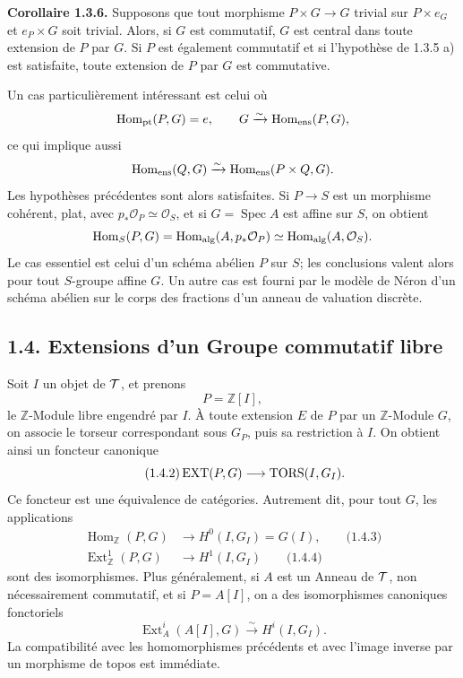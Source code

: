 \documentclass[11pt]{article}
\providecommand{\Spec}{\operatorname{Spec}}
\providecommand{\cO}{\mathcal O}
\providecommand{\Z}{\mathbb Z}
\providecommand{\Hom}{\operatorname{Hom}}
\begin{document}
\textbf{Corollaire 1.3.6.}  Supposons que tout morphisme \(P\times G\to G\) trivial sur \(P\times e_G\) et \(e_P\times G\) soit trivial.  Alors, si \(G\) est commutatif, \(G\) est central dans toute extension de \(P\) par \(G\).  Si \(P\) est également commutatif et si l'hypothèse de 1.3.5 a) est satisfaite, toute extension de \(P\) par \(G\) est commutative.

Un cas particulièrement intéressant est celui où
\[
  \operatorname{Hom}_{\mathrm{pt}}(P,G)=e,\qquad
  G\xrightarrow{\sim}\operatorname{Hom}_{\mathrm{ens}}(P,G),
\]
ce qui implique aussi
\[
  \operatorname{Hom}_{\mathrm{ens}}(Q,G)\xrightarrow{\sim}\operatorname{Hom}_{\mathrm{ens}}(P\times Q,G).
\]
Les hypothèses précédentes sont alors satisfaites.  Si \(P\to S\) est un morphisme cohérent, plat, avec \(p_*\cO_P\simeq\cO_S\), et si \(G=\Spec A\) est affine sur \(S\), on obtient
\[
  \Hom_S(P,G)=\Homalg(A,p_*\cO_P)\simeq\Homalg(A,\cO_S).
\]
Le cas essentiel est celui d'un schéma abélien \(P\) sur \(S\); les conclusions valent alors pour tout \(S\)-groupe affine \(G\).  Un autre cas est fourni par le modèle de Néron d'un schéma abélien sur le corps des fractions d'un anneau de valuation discrète.

\subsection*{1.4. Extensions d'un Groupe commutatif libre}

Soit \(I\) un objet de \(\mathcal T\), et prenons
\[
  P=\Z[I],
\]
le \(\Z\)-Module libre engendré par \(I\).  À toute extension \(E\) de \(P\) par un \(\Z\)-Module \(G\), on associe le torseur correspondant sous \(G_P\), puis sa restriction à \(I\).  On obtient ainsi un foncteur canonique
\begin{equation}\qquad\text{(1.4.2)}
  \operatorname{EXT}(P,G)\longrightarrow \operatorname{TORS}(I,G_I).
\end{equation}
Ce foncteur est une équivalence de catégories.  Autrement dit, pour tout \(G\), les applications
\begin{align}
  \Hom_{\Z}(P,G)&\longrightarrow H^0(I,G_I)=G(I), \qquad\text{(1.4.3)}\\
  \operatorname{Ext}^{1}_{\Z}(P,G)&\longrightarrow H^1(I,G_I) \qquad\text{(1.4.4)}
\end{align}
sont des isomorphismes.  Plus généralement, si \(A\) est un Anneau de \(\mathcal T\), non nécessairement commutatif, et si \(P=A[I]\), on a des isomorphismes canoniques fonctoriels
\[
  \operatorname{Ext}^{i}_{A}(A[I],G)\xrightarrow{\sim}H^i(I,G_I).
\]
La compatibilité avec les homomorphismes précédents et avec l'image inverse par un morphisme de topos est immédiate.
\end{document}

